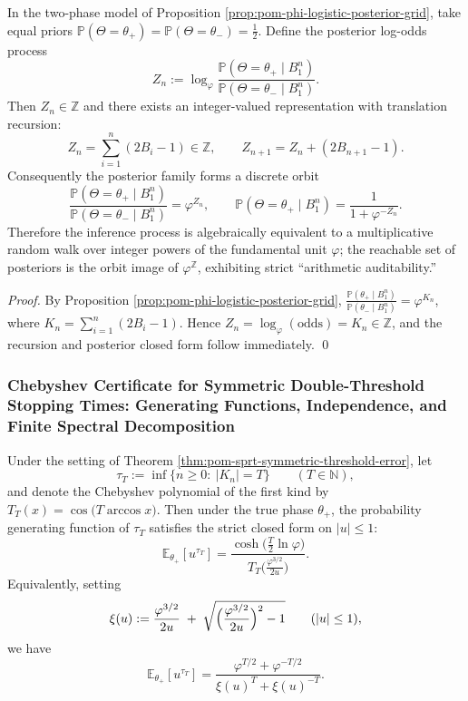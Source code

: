 \begin{corollary}\label{cor:pom-phi-logit-lattice-translation}
In the two-phase model of Proposition \ref{prop:pom-phi-logistic-posterior-grid}, take equal priors
\(\mathbb{P}(\Theta=\theta_+)=\mathbb{P}(\Theta=\theta_-)=\tfrac12\).
Define the posterior log-odds process
\[
Z_n:=\log_{\varphi}\frac{\mathbb{P}(\Theta=\theta_+\mid B_1^n)}{\mathbb{P}(\Theta=\theta_-\mid B_1^n)}.
\]
Then \(Z_n\in\mathbb{Z}\) and there exists an integer-valued representation with translation recursion:
\[
\boxed{\;Z_n=\sum_{i=1}^{n}(2B_i-1)\in\mathbb{Z},\qquad
Z_{n+1}=Z_n+(2B_{n+1}-1).\;}
\]
Consequently the posterior family forms a discrete orbit
\[
\boxed{\;\frac{\mathbb{P}(\Theta=\theta_+\mid B_1^n)}{\mathbb{P}(\Theta=\theta_-\mid B_1^n)}=\varphi^{Z_n},\qquad
\mathbb{P}(\Theta=\theta_+\mid B_1^n)=\frac{1}{1+\varphi^{-Z_n}}.\;}
\]
Therefore the inference process is algebraically equivalent to a multiplicative random walk over integer powers of the fundamental unit \(\varphi\); the reachable set of posteriors is the orbit image of \(\varphi^{\mathbb{Z}}\), exhibiting strict ``arithmetic auditability.''
\end{corollary}

\begin{proof}
By Proposition \ref{prop:pom-phi-logistic-posterior-grid},
\(
\frac{\mathbb{P}(\theta_+\mid B_1^n)}{\mathbb{P}(\theta_-\mid B_1^n)}=\varphi^{K_n}
\), where
\(
K_n=\sum_{i=1}^n(2B_i-1)
\).
Hence \(Z_n=\log_\varphi(\text{odds})=K_n\in\mathbb{Z}\), and the recursion and posterior closed form follow immediately. \qed
\end{proof}

\subsubsection{Chebyshev Certificate for Symmetric Double-Threshold Stopping Times: Generating Functions, Independence, and Finite Spectral Decomposition}\label{subsubsec:pom-chebyshev-stopping-time-spectral}

\begin{theorem}\label{thm:pom-symmetric-double-threshold-pgf-chebyshev}
Under the setting of Theorem \ref{thm:pom-sprt-symmetric-threshold-error}, let
\[
\tau_T:=\inf\{n\ge 0:\ |K_n|=T\}\qquad(T\in\mathbb{N}),
\]
and denote the Chebyshev polynomial of the first kind by \(T_T(x)=\cos\!\bigl(T\arccos x\bigr)\).
Then under the true phase \(\theta_+\), the probability generating function of \(\tau_T\) satisfies the strict closed form on \(|u|\le 1\):
\[
\boxed{\;
\mathbb{E}_{\theta_+}[u^{\tau_T}]
=\frac{\cosh\!\bigl(\tfrac{T}{2}\ln\varphi\bigr)}{T_T\!\bigl(\tfrac{\varphi^{3/2}}{2u}\bigr)}.\;}
\]
Equivalently, setting
\[
\xi(u):=\frac{\varphi^{3/2}}{2u}
\;+\;\sqrt{\Bigl(\frac{\varphi^{3/2}}{2u}\Bigr)^2-1}\qquad(|u|\le 1),
\]
we have
\[
\boxed{\;
\mathbb{E}_{\theta_+}[u^{\tau_T}]
=\frac{\varphi^{T/2}+\varphi^{-T/2}}{\xi(u)^T+\xi(u)^{-T}}.\;}
\]
\end{theorem}


